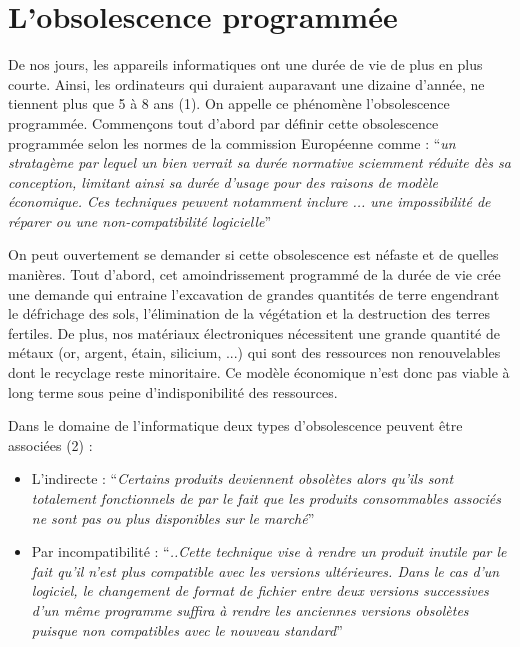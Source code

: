 \documentclass[10pt]{../fiche}
\begin{document}
\section*{L'obsolescence programmée}

De nos jours, les appareils informatiques ont une durée de vie de plus en plus courte. Ainsi, les ordinateurs qui duraient auparavant une dizaine d'année, ne tiennent plus que 5 à 8 ans (1). On appelle ce phénomène l'obsolescence programmée. Commençons tout d'abord par définir  cette obsolescence programmée selon les normes de la commission
Européenne comme :
``\textit{un stratagème par lequel un bien verrait sa durée
normative sciemment réduite dès sa conception, limitant
ainsi sa durée d'usage pour des raisons de modèle économique.
Ces techniques peuvent notamment inclure
... une impossibilité de réparer ou une non-compatibilité
logicielle}''

On peut ouvertement se demander si cette obsolescence est néfaste et de quelles manières. Tout d'abord, cet amoindrissement programmé de la durée de vie crée une demande qui entraine l'excavation de grandes quantités de terre engendrant le défrichage des sols, l'élimination de la végétation et la destruction des terres fertiles. De plus, nos matériaux électroniques nécessitent une grande quantité de métaux (or, argent, étain, silicium, ...) qui sont des ressources non renouvelables dont le recyclage reste minoritaire. Ce modèle économique n'est donc pas viable à long terme sous peine d'indisponibilité des ressources.

Dans le domaine de l'informatique deux types d'obsolescence peuvent être associées (2) :
\begin{itemize}
  \item L'indirecte : ``\textit{Certains produits deviennent obsolètes alors qu'ils sont totalement fonctionnels de par le fait que les produits consommables associés ne sont pas ou plus disponibles sur le marché}''

  \item Par incompatibilité : ``\textit{..Cette technique vise à rendre un produit inutile par le fait qu'il n'est plus compatible
    avec les versions ultérieures. Dans le cas d'un logiciel, le changement de format de fichier entre deux versions successives d'un même programme suffira à rendre les anciennes versions obsolètes puisque non compatibles avec le nouveau standard}''
\end{itemize}
\end{document}
